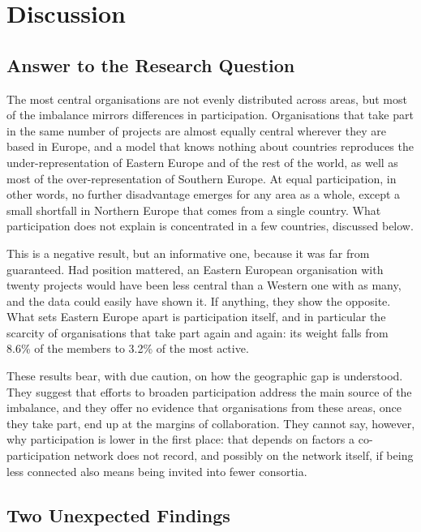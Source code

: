 \documentclass[sigchi]{acmart}
\begin{document}
\section{Discussion}
\label{sec:discussion}
\subsection{Answer to the Research Question}

The most central organisations are not evenly distributed across areas, but most of the imbalance mirrors differences in participation. Organisations that take part in the same number of projects are almost equally central wherever they are based in Europe, and a model that knows nothing about countries reproduces the under-representation of Eastern Europe and of the rest of the world, as well as most of the over-representation of Southern Europe. At equal participation, in other words, no further disadvantage emerges for any area as a whole, except a small shortfall in Northern Europe that comes from a single country. What participation does not explain is concentrated in a few countries, discussed below.

This is a negative result, but an informative one, because it was far from guaranteed. Had position mattered, an Eastern European organisation with twenty projects would have been less central than a Western one with as many, and the data could easily have shown it. If anything, they show the opposite. What sets Eastern Europe apart is participation itself, and in particular the scarcity of organisations that take part again and again: its weight falls from 8.6\% of the members to 3.2\% of the most active.

These results bear, with due caution, on how the geographic gap is understood. They suggest that efforts to broaden participation address the main source of the imbalance, and they offer no evidence that organisations from these areas, once they take part, end up at the margins of collaboration. They cannot say, however, why participation is lower in the first place: that depends on factors a co-participation network does not record, and possibly on the network itself, if being less connected also means being invited into fewer consortia.

\subsection{Two Unexpected Findings}
\end{document}
